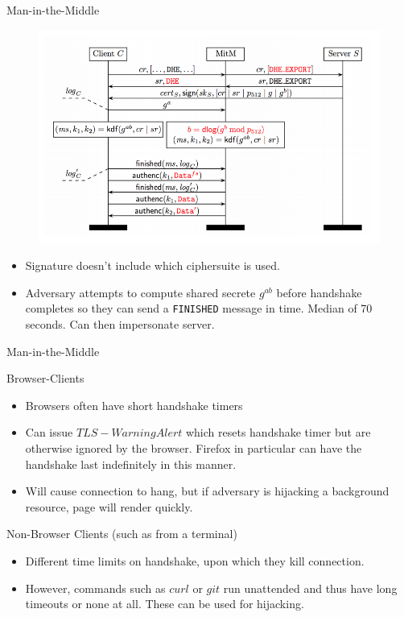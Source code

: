 \documentclass[presentation, aspectratio=54]{beamer}
\begin{document}
\begin{frame}{Man-in-the-Middle}

\begin{figure}
\centering
\includegraphics[width=0.8\columnwidth]{graphics/logjam.png}
\end{figure}

\begin{itemize}
\item Signature doesn't include which ciphersuite is used.
\item Adversary attempts to compute shared secrete $g^{ab}$ before handshake
      completes so they can send a \texttt{FINISHED} message in time. Median of
      70 seconds. Can then impersonate server.
\end{itemize} 

\end{frame}


\begin{frame}{Man-in-the-Middle}

Browser-Clients
\begin{itemize}
\item Browsers often have short handshake timers
\item Can issue $TLS-Warning Alert$ which resets handshake timer but are
      otherwise ignored by the browser. Firefox in particular can have the
      handshake last indefinitely in this manner. 
\item Will cause connection to hang, but if adversary is hijacking a
      background resource, page will render quickly.
\end{itemize}
Non-Browser Clients (such as from a terminal)
\begin{itemize}
\item Different time limits on handshake, upon which they kill connection.
\item However, commands such as $curl$ or $git$ run unattended and thus have
      long timeouts or none at all. These can be used for hijacking.
\end{itemize}

\end{frame}
\end{document}
